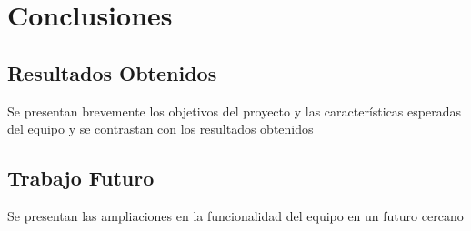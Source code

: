 \chapter{Conclusiones}
\label{Chapter5}

\section{Resultados Obtenidos}

Se presentan brevemente los objetivos del proyecto y las características esperadas del equipo y se contrastan con los resultados obtenidos

\section{Trabajo Futuro}

Se presentan las ampliaciones en la funcionalidad del equipo en un futuro cercano
